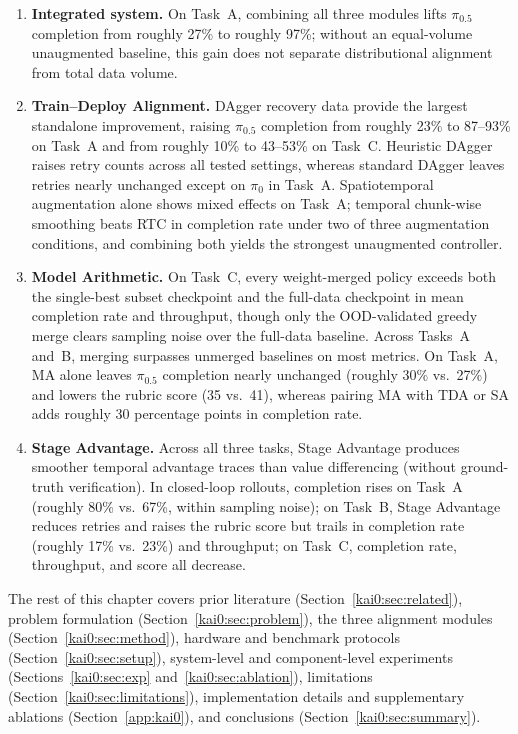\begin{enumerate}
  \item \textbf{Integrated system.} On Task~A, combining all three modules lifts $\pi_{0.5}$ completion from roughly 27\% to roughly 97\%; without an equal-volume unaugmented baseline, this gain does not separate distributional alignment from total data volume.
  \item \textbf{Train--Deploy Alignment.} DAgger recovery data provide the largest standalone improvement, raising $\pi_{0.5}$ completion from roughly 23\% to 87--93\% on Task~A and from roughly 10\% to 43--53\% on Task~C. Heuristic DAgger raises retry counts across all tested settings, whereas standard DAgger leaves retries nearly unchanged except on $\pi_{0}$ in Task~A. Spatiotemporal augmentation alone shows mixed effects on Task~A; temporal chunk-wise smoothing beats RTC in completion rate under two of three augmentation conditions, and combining both yields the strongest unaugmented controller.
  \item \textbf{Model Arithmetic.} On Task~C, every weight-merged policy exceeds both the single-best subset checkpoint and the full-data checkpoint in mean completion rate and throughput, though only the OOD-validated greedy merge clears sampling noise over the full-data baseline. Across Tasks~A and~B, merging surpasses unmerged baselines on most metrics. On Task~A, MA alone leaves $\pi_{0.5}$ completion nearly unchanged (roughly 30\% vs.\ 27\%) and lowers the rubric score (35 vs.\ 41), whereas pairing MA with TDA or SA adds roughly 30 percentage points in completion rate.
  \item \textbf{Stage Advantage.} Across all three tasks, Stage Advantage produces smoother temporal advantage traces than value differencing (without ground-truth verification). In closed-loop rollouts, completion rises on Task~A (roughly 80\% vs.\ 67\%, within sampling noise); on Task~B, Stage Advantage reduces retries and raises the rubric score but trails in completion rate (roughly 17\% vs.\ 23\%) and throughput; on Task~C, completion rate, throughput, and score all decrease.
\end{enumerate}

The rest of this chapter covers prior literature (Section~\ref{kai0:sec:related}), problem formulation (Section~\ref{kai0:sec:problem}), the three alignment modules (Section~\ref{kai0:sec:method}), hardware and benchmark protocols (Section~\ref{kai0:sec:setup}), system-level and component-level experiments (Sections~\ref{kai0:sec:exp} and~\ref{kai0:sec:ablation}), limitations (Section~\ref{kai0:sec:limitations}), implementation details and supplementary ablations (Section~\ref{app:kai0}), and conclusions (Section~\ref{kai0:sec:summary}).

